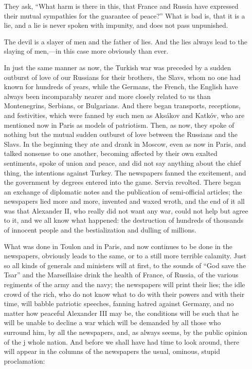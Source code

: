 \documentclass{book}
\begin{document}
They ask, “What harm is there in this, that France and Russia have expressed their mutual sympathies for the guarantee of peace?” What is bad is, that it is a lie, and a lie is never spoken with impunity, and does not pass unpunished.

The devil is a slayer of men and the father of lies. And the lies always lead to the slaying of men,—in this case more obviously than ever.

In just the same manner as now, the Turkish war was preceded by a sudden outburst of love of our Russians for their brothers, the Slavs, whom no one had known for hundreds of years, while the Germans, the French, the English have always been incomparably nearer and more closely related to us than Montenegrins, Serbians, or Bulgarians. And there began transports, receptions, and festivities, which were fanned by such men as Aksákov and Katkóv, who are mentioned now in Paris as models of patriotism. Then, as now, they spoke of nothing but the mutual sudden outburst of love between the Russians and the Slavs. In the beginning they ate and drank in Moscow, even as now in Paris, and talked nonsense to one another, becoming affected by their own exalted sentiments, spoke of union and peace, and did not say anything about the chief thing, the intentions against Turkey. The newspapers fanned the excitement, and the government by degrees entered into the game. Servia revolted. There began an exchange of diplomatic notes and the publication of semi-official articles; the newspapers lied more and more, invented and waxed wroth, and the end of it all was that Alexander II, who really did not want any war, could not help but agree to it, and we all know what happened: the destruction of hundreds of thousands of innocent people and the bestialization and dulling of millions.

What was done in Toulon and in Paris, and now continues to be done in the newspapers, obviously leads to the same, or to a still more terrible calamity. Just so all kinds of generals and ministers will at first, to the sounds of “God save the Tsar” and the Marseillaise drink the health of France, of Russia, of the various regiments of the army and the navy; the newspapers will print their lies; the idle crowd of the rich, who do not know what to do with their powers and with their time, will babble patriotic speeches, fanning hatred against Germany, and no matter how peaceful Alexander III may be, the conditions will be such that he will be unable to decline a war which will be demanded by all those who surround him, by all the newspapers, and, as always seems, by the public opinion of the j whole nation. And before we shall have had time to look around, there will appear in the columns of the newspapers the usual, ominous, stupid proclamation:
\end{document}

